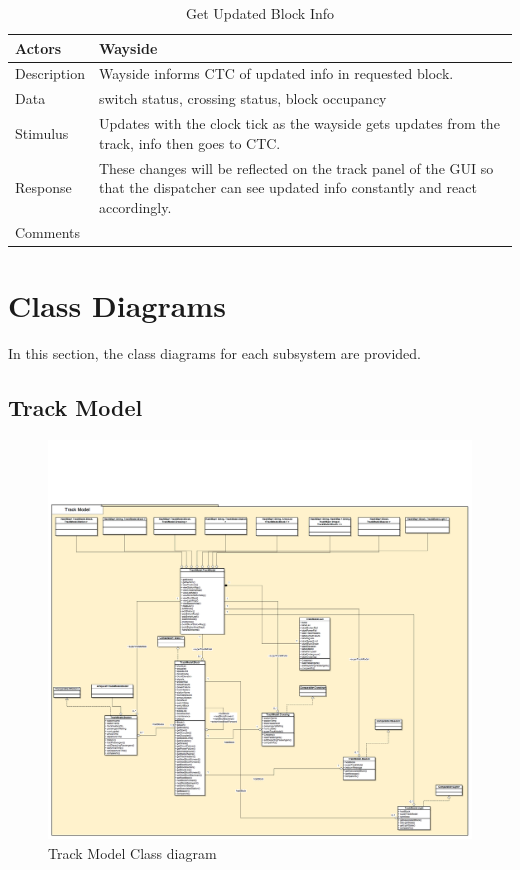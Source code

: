 \documentclass[]{article}
\begin{document}
\begin{table}[H]
	\centering
	\caption{Get Updated Block Info}
	\begin{tabular}{|l|l|}
		\hline
		Actors & \parbox[t]{10cm}{Wayside} \\ \hline
		Description & \parbox[t]{10cm}{Wayside informs CTC of updated info in requested block.} \\ \hline
		Data &  \parbox[t]{10cm}{switch status, crossing status, block occupancy} \\ \hline
		Stimulus &  \parbox[t]{10cm}{Updates with the clock tick as the wayside gets updates from the track, info then goes to CTC.} \\ \hline
		Response & \parbox[t]{10cm}{These changes will be reflected on the track panel of the GUI so that the dispatcher can see updated info constantly and react accordingly.}\\ \hline
		Comments & \parbox[t]{10cm}{ }  \\ \hline
	\end{tabular}
\end{table}

\section{Class Diagrams}
In this section, the class diagrams for each subsystem are provided.
\subsection{Track Model}
\begin{figure}[H]
	\centering
	\includegraphics[scale=.2]{trackmodel.png}
	\caption{Track Model Class diagram}
\end{figure}
\end{document}
